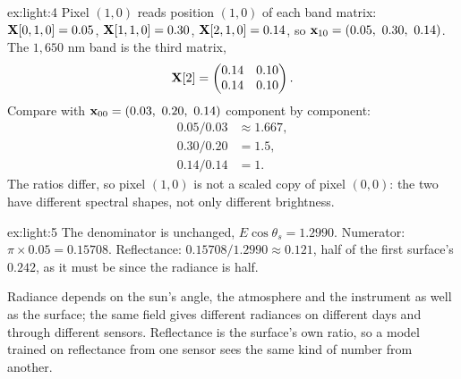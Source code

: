 \begin{solution}{ex:light:4}
Pixel $(1,0)$ reads position $(1,0)$ of each band matrix:
$\mathbf{X}[0,1,0] = 0.05$, $\mathbf{X}[1,1,0] = 0.30$, $\mathbf{X}[2,1,0] = 0.14$, so
$\mathbf{x}_{10} = (0.05,\ 0.30,\ 0.14)$. The $1{,}650$ nm band is the third matrix,
\[ \mathbf{X}[2] = \begin{pmatrix} 0.14 & 0.10 \\ 0.14 & 0.10 \end{pmatrix}. \]
Compare with $\mathbf{x}_{00} = (0.03,\ 0.20,\ 0.14)$ component by component:
\begin{align*}
0.05/0.03 &\approx 1.667,\\
0.30/0.20 &= 1.5,\\
0.14/0.14 &= 1.
\end{align*}
The ratios differ, so pixel $(1,0)$ is not a scaled copy of pixel $(0,0)$: the two have different
spectral shapes, not only different brightness.
\end{solution}

\begin{solution}{ex:light:5}
The denominator is unchanged, $E\cos\theta_s = 1.2990$. Numerator:
$\pi \times 0.05 = 0.15708$. Reflectance: $0.15708/1.2990 \approx 0.121$, half of the first
surface's $0.242$, as it must be since the radiance is half.

Radiance depends on the sun's angle, the atmosphere and the instrument as well as the surface;
the same field gives different radiances on different days and through different sensors.
Reflectance is the surface's own ratio, so a model trained on reflectance from one sensor sees the
same kind of number from another.
\end{solution}
